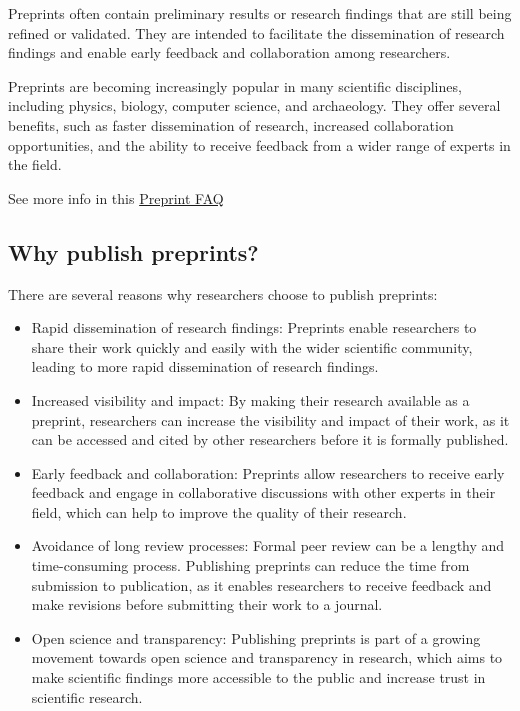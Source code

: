 \documentclass[
  letterpaper,
  DIV=11,
  numbers=noendperiod]{scrreprt}
\begin{document}
Preprints often contain preliminary results or research findings that
are still being refined or validated. They are intended to facilitate
the dissemination of research findings and enable early feedback and
collaboration among researchers.

Preprints are becoming increasingly popular in many scientific
disciplines, including physics, biology, computer science, and
archaeology. They offer several benefits, such as faster dissemination
of research, increased collaboration opportunities, and the ability to
receive feedback from a wider range of experts in the field.

See more info in this
\href{https://help.osf.io/article/230-preprint-faqs}{Preprint FAQ}

\hypertarget{why-publish-preprints}{%
\subsection*{\texorpdfstring{\textbf{Why publish
preprints?}}{Why publish preprints?}}\label{why-publish-preprints}}

There are several reasons why researchers choose to publish preprints:

\begin{itemize}
\item
  Rapid dissemination of research findings: Preprints enable researchers
  to share their work quickly and easily with the wider scientific
  community, leading to more rapid dissemination of research findings.
\item
  Increased visibility and impact: By making their research available as
  a preprint, researchers can increase the visibility and impact of
  their work, as it can be accessed and cited by other researchers
  before it is formally published.
\item
  Early feedback and collaboration: Preprints allow researchers to
  receive early feedback and engage in collaborative discussions with
  other experts in their field, which can help to improve the quality of
  their research.
\item
  Avoidance of long review processes: Formal peer review can be a
  lengthy and time-consuming process. Publishing preprints can reduce
  the time from submission to publication, as it enables researchers to
  receive feedback and make revisions before submitting their work to a
  journal.
\item
  Open science and transparency: Publishing preprints is part of a
  growing movement towards open science and transparency in research,
  which aims to make scientific findings more accessible to the public
  and increase trust in scientific research.
\end{itemize}
\end{document}
